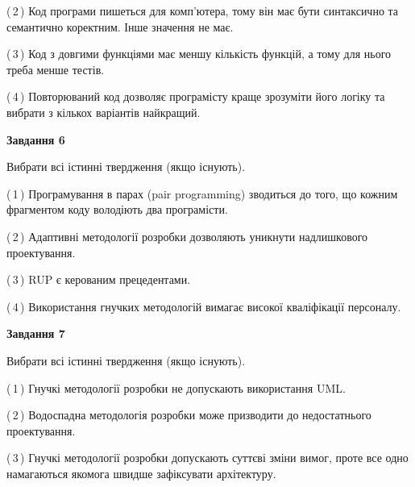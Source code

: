 \documentclass[10pt, ukrainian]{article}
\begin{document}
{\begin {large}
(\,2\,) Код програми пишеться для комп'ютера, тому він має бути синтаксично та семантично коректним. Інше значення не має. %



(\,3\,) Код з довгими функціями має меншу кількість функцій, а тому для нього треба менше тестів. %



(\,4\,) Повторюваний код дозволяє програмісту краще зрозуміти його логіку та вибрати з кількох варіантів найкращий. %

\newpage

{\begin {center}\textbf{Завдання 6}\end {center}}\par
Вибрати всі істинні твердження (якщо існують).\par
\vspace{2mm}



(\,1\,) Програмування в парах (pair programming) зводиться до того, що кожним фрагментом коду володіють два програмісти. %



(\,2\,) Адаптивні методології розробки дозволяють уникнути надлишкового проектування. %



(\,3\,) RUP є керованим прецедентами. %



(\,4\,) Використання гнучких методологій вимагає високої кваліфікації персоналу. %


{\begin {center}\textbf{Завдання 7}\end {center}}\par
Вибрати всі істинні твердження (якщо існують).\par
\vspace{2mm}



(\,1\,) Гнучкі методології розробки не допускають використання UML. %



(\,2\,) Водоспадна методологія розробки може призводити до недостатнього проектування. %



(\,3\,) Гнучкі методології розробки допускають суттєві зміни вимог, проте все одно намагаються якомога швидше зафіксувати архітектуру. %




\end{large}}
\end{document}
